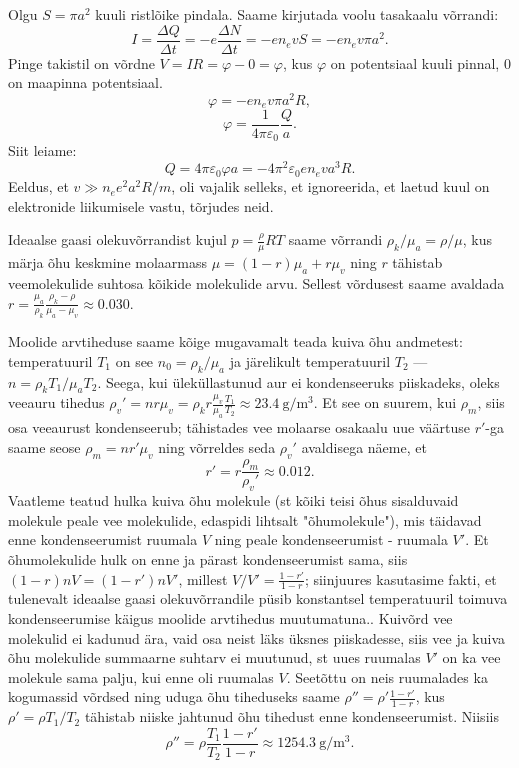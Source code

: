\documentclass[10pt]{article}
\begin{document}
Olgu $S=\pi a^2$ kuuli ristlõike pindala. Saame kirjutada voolu tasakaalu võrrandi:
$$I = \frac{\Delta Q}{\Delta t} = -e \frac{\Delta N}{\Delta t} = -e n_e v S = -e n_e v \pi a^2.$$
Pinge takistil on võrdne $V = I R = \varphi - 0 = \varphi$, kus $\varphi$ on potentsiaal kuuli pinnal, 0 on maapinna potentsiaal.
$$\varphi = -e n_e v \pi a^2 R,$$
$$\varphi = \frac{1}{4 \pi \varepsilon_0} \frac{Q}{a}.$$
Siit leiame:
$$Q = 4 \pi \varepsilon_0 \varphi a = -4 \pi^2 \varepsilon_0 e n_e v a^3 R.$$
Eeldus, et $v \gg n_e e^2 a^2 R / m$, oli vajalik selleks, et ignoreerida, et laetud kuul on elektronide liikumisele vastu, tõrjudes neid.
\probend
\bigskip


\solu
Ideaalse gaasi olekuvõrrandist kujul $p=\frac \rho\mu RT$ saame võrrandi $\rho_k/\mu_a=\rho/\mu$, kus märja õhu keskmine molaarmass $\mu=(1-r)\mu_a+r\mu_v$ ning $r$ tähistab veemolekulide suhtosa kõikide molekulide arvu. Sellest võrdusest saame avaldada $r=\frac {\mu_a}{\rho_k}\frac{\rho_k-\rho}{\mu_a-\mu_v}\approx \num{0.030}$.

Moolide arvtiheduse saame kõige mugavamalt teada kuiva õhu andmetest: temperatuuril $T_1$ on see $n_0=\rho_k/\mu_a$ ja järelikult temperatuuril $T_2$ ---  $n=\rho_kT_1/\mu_aT_2$. Seega, kui üleküllastunud aur ei kondenseeruks piiskadeks, oleks veeauru tihedus $\rho_v'=nr\mu_v= \rho_kr\frac {\mu_v}{\mu_a}\frac{T_1}{T_2}\approx\SI{23.4}{\g\per\m\cubed}$. Et see on suurem, kui $\rho_m$, siis osa veeaurust kondenseerub; tähistades vee molaarse osakaalu uue väärtuse $r'$-ga saame seose $\rho_m=nr'\mu_v$ ning võrreldes seda $\rho_v'$ avaldisega näeme, et
\[
  r'=r\frac {\rho_m}{\rho_v'}\approx \num{0.012}.
\]
Vaatleme teatud hulka kuiva õhu molekule (st kõiki teisi õhus sisalduvaid molekule peale vee molekulide, edaspidi lihtsalt "õhumolekule"), mis täidavad enne kondenseerumist ruumala $V$ ning peale kondenseerumist - ruumala $V'$. Et õhumolekulide hulk on enne ja pärast kondenseerumist sama, siis $(1-r)nV=(1-r')nV'$, millest $V/V'=\frac{1-r'}{1-r}$; siinjuures kasutasime fakti, et tulenevalt ideaalse gaasi olekuvõrrandile püsib konstantsel temperatuuril toimuva kondenseerumise käigus moolide arvtihedus muutumatuna.. Kuivõrd vee molekulid ei kadunud ära, vaid osa neist läks üksnes piiskadesse, siis  vee ja kuiva õhu molekulide summaarne suhtarv ei muutunud, st uues ruumalas $V'$ on ka vee molekule sama palju, kui enne oli ruumalas $V$. Seetõttu on neis ruumalades ka kogumassid võrdsed ning uduga õhu tiheduseks saame  $\rho''=\rho'\frac{1-r'}{1-r}$, kus $\rho'=\rho T_1/T_2$ tähistab niiske jahtunud õhu tihedust enne kondenseerumist. Niisiis
\[\rho''=\rho \frac{T_1}{T_2} \frac{1-r'}{1-r}\approx \SI{1254.3}{\g\per\m\cubed}.\]
\probend
\bigskip
\end{document}

